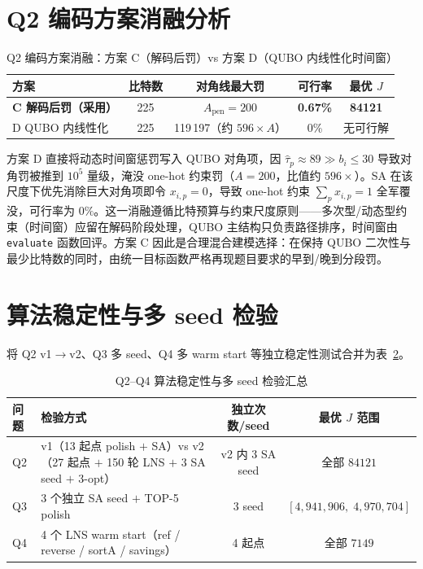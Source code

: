 \documentclass[UTF8,12pt,a4paper]{ctexart}
\begin{document}
\section{Q2 编码方案消融分析}
\label{sec:sens-ablation}

\begin{table}[H]
    \centering
    \caption{Q2 编码方案消融：方案 C（解码后罚）vs 方案 D（QUBO 内线性化时间窗）}
    \label{tab:sens-encoding}
    \begin{tabular}{lcccc}
        \toprule
        方案 & 比特数 & 对角线最大罚 & 可行率 & 最优 $J$ \\
        \midrule
        \textbf{C 解码后罚（采用）}    & 225 & $A_{\text{pen}}\!=\!200$ & \textbf{0.67\%} & \textbf{84121} \\
        D QUBO 内线性化            & 225 & 119\,197（约 $596\!\times\!A$）& 0\% & 无可行解 \\
        \bottomrule
    \end{tabular}
\end{table}

方案 D 直接将动态时间窗惩罚写入 QUBO 对角项，因 $\hat\tau_p\!\approx\!89\!\gg\!b_i\!\le\!30$ 导致对角罚被推到 $10^5$ 量级，淹没 one-hot 约束罚（$A\!=\!200$，比值约 $596\!\times$）。SA 在该尺度下优先消除巨大对角项即令 $x_{i,p}\!=\!0$，导致 one-hot 约束 $\sum_p x_{i,p}\!=\!1$ 全军覆没，可行率为 $0\%$。这一消融遵循比特预算与约束尺度原则——多次型/动态型约束（时间窗）应留在解码阶段处理，QUBO 主结构只负责路径排序，时间窗由 \texttt{evaluate} 函数回评。方案 C 因此是合理混合建模选择：在保持 QUBO 二次性与最少比特数的同时，由统一目标函数严格再现题目要求的早到/晚到分段罚。

\section{算法稳定性与多 seed 检验}
\label{sec:sens-stability}

将 Q2 v1$\to$v2、Q3 多 seed、Q4 多 warm start 等独立稳定性测试合并为表~\ref{tab:sens-stability}。

\begin{table}[H]
    \centering
    \caption{Q2--Q4 算法稳定性与多 seed 检验汇总}
    \label{tab:sens-stability}
    \footnotesize
    \begin{tabular}{lp{6cm}cc}
        \toprule
        问题 & 检验方式 & 独立次数/seed & 最优 $J$ 范围 \\
        \midrule
        Q2 & v1（13 起点 polish $+$ SA）vs v2（27 起点 $+$ 150 轮 LNS $+$ 3 SA seed $+$ 3-opt）& v2 内 3 SA seed & 全部 $84121$ \\
        Q3 & 3 个独立 SA seed $+$ TOP-5 polish & 3 seed & $[4{,}941{,}906,\;4{,}970{,}704]$ \\
        Q4 & 4 个 LNS warm start（ref / reverse / sortA / savings）& 4 起点 & 全部 $7149$ \\
        \bottomrule
    \end{tabular}
\end{table}
\end{document}
